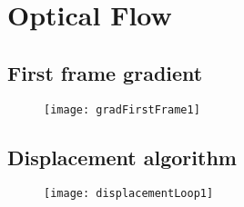 
\chapter{Optical Flow} %

\label{AppendixA} %

\section{First frame gradient}

\begin{figure}[!htbp]
\centering
\texttt{[image: gradFirstFrame1]}
\end{figure}


\section{Displacement algorithm}

\begin{figure}[!htbp]
\centering
\texttt{[image: displacementLoop1]}
\end{figure}
